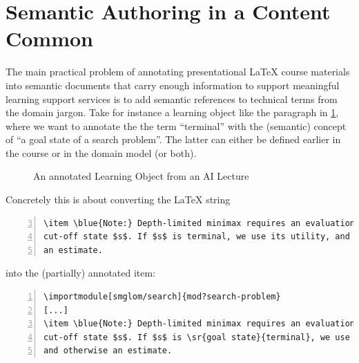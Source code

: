 \documentclass{llncs}
\def\llangle{\langle\kern-.2em\langle}
\def\rrangle{\rangle\kern-.2em\rangle}
\begin{document}
\section{Semantic Authoring in a Content Common}
The main practical problem of annotating presentational {\LaTeX} course materials into
semantic documents that carry enough information to support meaningful learning support
services is to add semantic references to technical terms from the domain jargon. Take for
instance a learning object like the paragraph in \cref{fig:lo}, where we want to annotate
the the term ``terminal'' with the (semantic) concept of ``a goal state of a search problem''. The latter can either be defined earlier in the course or in the domain model
(or both).

\begin{figure}[ht]\centering
  \caption{An annotated Learning Object from an AI Lecture}\label{fig:lo}
\end{figure}

Concretely this is about converting the {\LaTeX} string
\begin{lstlisting}[numbers=left,firstnumber=3,
caption=The {\LaTeX} sources of \cref{fig:lo},label=lst:los]
\item \blue{Note:} Depth-limited minimax requires an evaluation for every
cut-off state $s$. If $s$ is terminal, we use its utility, and otherwise
an estimate.
\end{lstlisting}
into the (partially) annotated item:
\begin{lstlisting}[morekeywords={sr,importmodule},numbers=left,
caption=Annotating ``terminal'' in \cref{lst:los},label=lst:losa]
\importmodule[smglom/search]{mod?search-problem}
[...]
\item \blue{Note:} Depth-limited minimax requires an evaluation for every
cut-off state $s$. If $s$ is \sr{goal state}{terminal}, we use its utility,
and otherwise an estimate.
\end{lstlisting}
\end{document}
